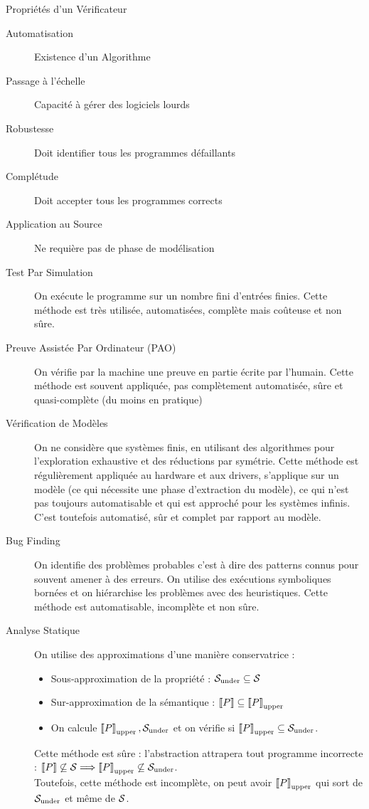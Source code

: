 \documentclass{cours}
\begin{document}
\begin{définition}{Propriétés d'un Vérificateur}{}
\begin{description}
	\item[Automatisation] Existence d'un Algorithme
	\item[Passage à l'échelle] Capacité à gérer des logiciels lourds
	\item[Robustesse] Doit identifier tous les programmes défaillants
	\item[Complétude] Doit accepter tous les programmes corrects
	\item[Application au Source] Ne requière pas de phase de modélisation
\end{description}
\end{définition}
\begin{description}
	\item[Test Par Simulation] On exécute le programme sur un nombre fini d'entrées finies. Cette méthode est très utilisée, automatisées, complète mais coûteuse et non sûre.
	\item[Preuve Assistée Par Ordinateur (PAO)] On vérifie par la machine une preuve en partie écrite par l'humain. Cette méthode est souvent appliquée, pas complètement automatisée, sûre et quasi-complète (du moins en pratique)
	\item[Vérification de Modèles] On ne considère que systèmes finis, en utilisant des algorithmes pour l'exploration exhaustive et des réductions par symétrie. Cette méthode est régulièrement appliquée au hardware et aux drivers, s'applique sur un modèle (ce qui nécessite une phase d'extraction du modèle), ce qui n'est pas toujours automatisable et qui est approché pour les systèmes infinis. C'est toutefois automatisé, sûr et complet par rapport au modèle.
	\item[Bug Finding] On identifie des problèmes \og probables \fg c'est à dire des patterns connus pour souvent amener à des erreurs. On utilise des exécutions symboliques bornées et on hiérarchise les problèmes avec des heuristiques. Cette méthode est automatisable, incomplète et non sûre.
	\item[Analyse Statique] On utilise des approximations d'une manière conservatrice :
	      \begin{itemize}
		      \item Sous-approximation de la propriété : $\mathcal{S}_{\rm under} \subseteq \mathcal{S}$
		      \item Sur-approximation de la sémantique : $\left\llbracket P \right\rrbracket \subseteq \left\llbracket P \right\rrbracket_{\rm upper}$
		      \item On calcule $\left\llbracket P \right\rrbracket_{\rm upper}, \mathcal{S}_{\rm under}$ et on vérifie si $\left\llbracket P \right\rrbracket_{\rm upper} \subseteq \mathcal{S}_{\rm under}$.
	      \end{itemize}
	      Cette méthode est sûre : l'abstraction attrapera tout programme incorrecte : $\left\llbracket P \right\rrbracket \not\subseteq \mathcal{S} \Longrightarrow \left\llbracket P \right\rrbracket_{\rm upper} \not\subseteq \mathcal{S}_{\rm{under}}$.\\
	      Toutefois, cette méthode est incomplète, on peut avoir $\left\llbracket P \right\rrbracket_{\rm upper}$ qui sort de $\mathcal{S}_{\rm under}$ et même de $\mathcal{S}$.
\end{description}
\end{document}
